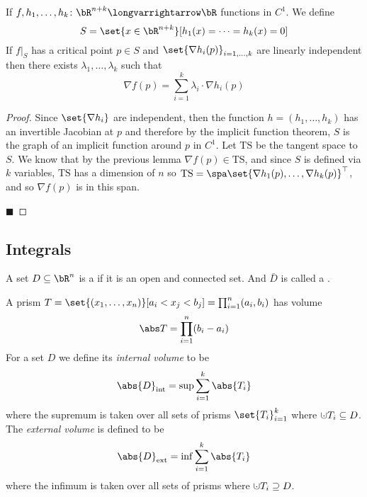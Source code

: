 \documentclass[10pt]{article}
\begin{document}


\bigskip

\begin{thrm*}

    If $f,h_1,\dots,h_k\colon\bR^{n+k}\longvarrightarrow\bR$ functions in $C^1$.
    We define
    \[ S = \set{x\in\bR^{n+k}}[h_1(x)=\dots=h_k(x)=0] \]
    If $f\big|_S$ has a critical point $p\in S$ and $\set{\nabla h_i(p)}_{i=1,\dots,k}$ are linearly independent then there exists $\lambda_1,\dots,\lambda_k$ such that
    \[ \nabla f(p) = \sum_{i=1}^k\lambda_i\cdot\nabla h_i(p) \]

\end{thrm*}

\begin{proof}

    Since $\set{\nabla h_i}$ are independent, then the function $h=(h_1,\dots,h_k)$ has an invertible Jacobian at $p$ and therefore by the implicit function theorem, $S$ is the graph of an implicit function
    around $p$ in $C^1$.
    Let $\mathrm{TS}$ be the tangent space to $S$.
    We know that by the previous lemma $\nabla f(p)\in\mathrm{TS}$, and since $S$ is defined via $k$ variables, $\mathrm{TS}$ has a dimension of $n$ so
    $\mathrm{TS}=\spa\set{\nabla h_1(p),\dots,\nabla h_k(p)}^\top$, and so $\nabla f(p)$ is in this span.

    \hfill$\blacksquare$

\end{proof}

\subsection{Integrals}

\begin{defn*}

    A set $D\subseteq\bR^n$ is a  if it is an open and connected set.
    And $\bar D$ is called a .

\end{defn*}

A prism $T=\set{(x_1,\dots,x_n)}[a_i<x_j<b_j]=\prod_{i=1}^n (a_i,b_i)$ has volume
\[ \abs T = \prod_{i=1}^n (b_i-a_i) \]
For a set $D$ we define its \emph{internal volume} to be
\[ \abs{D}_{\rm int} = \sup\sum_{i=1}^k\abs{T_i} \]
where the supremum is taken over all sets of prisms $\set{T_i}_{i=1}^k$ where $\dcup T_i\subseteq D$.
The \emph{external volume} is defined to be
\[ \abs{D}_{\rm ext} = \inf\sum_{i=1}^k\abs{T_i} \]
where the infimum is taken over all sets of prisms where $\dcup T_i\supseteq D$.
\end{document}
